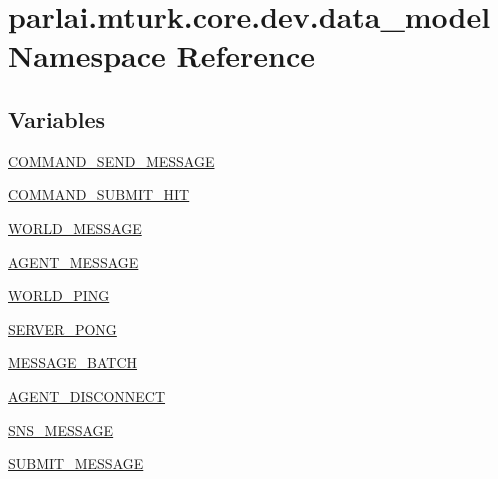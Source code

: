 \hypertarget{namespaceparlai_1_1mturk_1_1core_1_1dev_1_1data__model}{}\section{parlai.\+mturk.\+core.\+dev.\+data\+\_\+model Namespace Reference}
\label{namespaceparlai_1_1mturk_1_1core_1_1dev_1_1data__model}
\subsection*{Variables}
\begin{DoxyCompactItemize}
\item 
\hyperlink{namespaceparlai_1_1mturk_1_1core_1_1dev_1_1data__model_ac6e9fa4825ca973597f8080f7ec08d7c}{C\+O\+M\+M\+A\+N\+D\+\_\+\+S\+E\+N\+D\+\_\+\+M\+E\+S\+S\+A\+GE}
\item 
\hyperlink{namespaceparlai_1_1mturk_1_1core_1_1dev_1_1data__model_aea57be0b47b199caebd2bde75b4fce27}{C\+O\+M\+M\+A\+N\+D\+\_\+\+S\+U\+B\+M\+I\+T\+\_\+\+H\+IT}
\item 
\hyperlink{namespaceparlai_1_1mturk_1_1core_1_1dev_1_1data__model_abded8a532aa185e636549d7be2c8a7df}{W\+O\+R\+L\+D\+\_\+\+M\+E\+S\+S\+A\+GE}
\item 
\hyperlink{namespaceparlai_1_1mturk_1_1core_1_1dev_1_1data__model_a9bf3c5d52bc6afba6c0cec44f9819388}{A\+G\+E\+N\+T\+\_\+\+M\+E\+S\+S\+A\+GE}
\item 
\hyperlink{namespaceparlai_1_1mturk_1_1core_1_1dev_1_1data__model_ae5b633ac9ab6c04037439cf2a820d16f}{W\+O\+R\+L\+D\+\_\+\+P\+I\+NG}
\item 
\hyperlink{namespaceparlai_1_1mturk_1_1core_1_1dev_1_1data__model_a3a3a5b73e8e7c61d1294618918ffdcf5}{S\+E\+R\+V\+E\+R\+\_\+\+P\+O\+NG}
\item 
\hyperlink{namespaceparlai_1_1mturk_1_1core_1_1dev_1_1data__model_a7cc19e288e6be38565c11afb0072bbcb}{M\+E\+S\+S\+A\+G\+E\+\_\+\+B\+A\+T\+CH}
\item 
\hyperlink{namespaceparlai_1_1mturk_1_1core_1_1dev_1_1data__model_a1c110870a9974f3fa86c0c272fa2532b}{A\+G\+E\+N\+T\+\_\+\+D\+I\+S\+C\+O\+N\+N\+E\+CT}
\item 
\hyperlink{namespaceparlai_1_1mturk_1_1core_1_1dev_1_1data__model_ac6c5c3cb8b728d9c77351879aa86135f}{S\+N\+S\+\_\+\+M\+E\+S\+S\+A\+GE}
\item 
\hyperlink{namespaceparlai_1_1mturk_1_1core_1_1dev_1_1data__model_a0a8d11cde1c3d7853000d2ddf343a79d}{S\+U\+B\+M\+I\+T\+\_\+\+M\+E\+S\+S\+A\+GE}

\end{DoxyCompactItemize}
